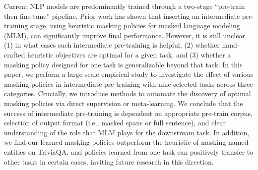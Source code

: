 Current NLP models are predominantly trained through a two-stage ``pre-train then fine-tune'' pipeline. Prior work has shown that inserting an intermediate pre-training stage, using heuristic masking policies for masked language modeling (MLM), can significantly improve final performance. However, it is still unclear (1) in what cases such intermediate pre-training is helpful, (2) whether hand-crafted heuristic objectives are optimal for a given task, and (3) whether a masking policy designed for one task is generalizable beyond that task. In this paper, we perform a large-scale empirical study to investigate the effect of various masking policies in intermediate pre-training with nine selected tasks across three categories. Crucially, we introduce methods to automate the discovery of optimal masking policies via direct supervision or meta-learning. We conclude that the success of intermediate pre-training is dependent on appropriate pre-train corpus, selection of output format (i.e., masked spans or full sentence), and clear understanding of the role that MLM plays for the downstream task. In addition, we find our learned masking policies outperform the heuristic of masking named entities on TriviaQA, and policies learned from one task can positively transfer to other tasks in certain cases, inviting future research in this direction.
